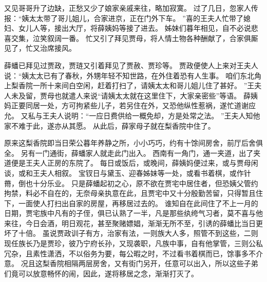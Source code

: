 又见哥哥升了边缺，正愁又少了娘家亲戚来往，略加寂寞。
过了几日，忽家人传报：“姨太太带了哥儿姐儿，合家进京，正在门外下车。
”喜的王夫人忙带了媳妇、女儿人等，接出大厅，将薛姨妈等接了进去。
姊妹们暮年相见，自不必说悲喜交集，泣笑叙阔一番。
忙又引了拜见贾母，将人情土物各种酬献了，合家俱厮见了，忙又治席接风。
\par
薛蟠已拜见过贾政，贾琏又引着拜见了贾赦、贾珍等。
贾政便使人上来对王夫人说：“姨太太已有了春秋，外甥年轻不知世路，在外住着恐有人生事。
咱们东北角上梨香院一所十来间白空闲，赶着打扫了，请姨太太和哥儿姐儿住了甚好。
”王夫人未及留，贾母也就遣人来说“请姨太太就在这里住下，大家亲密些”等语。
薛姨妈正要同居一处，方可拘紧些儿子，若另住在外，又恐他纵性惹祸，遂忙道谢应允。
又私与王夫人说明：“一应日费供给一概免却，方是处常之法。
”王夫人知他家不难于此，遂亦从其愿。
从此后，薛家母子就在梨香院中住了。
\par
原来这梨香院即当日荣公暮年养静之所，小小巧巧，约有十馀间房舍，前厅后舍俱全。
另有一门通街，薛蟠家人就走此门出入。
西南有一角门，通一夹道，出了夹道便是王夫人正房的东院了。
每日或饭后，或晚间，薛姨妈便过来，或与贾母闲谈，或和王夫人相叙。
宝钗日与黛玉、迎春姊妹等一处，或看书着棋，或作针黹，倒也十分乐业。
只是薛蟠起初之心，原不欲在贾宅中居住者，但恐姨父管约拘禁，料必不自在的，无奈母亲执意在此，且贾宅中又十分殷勤苦留，只得暂且住下，一面使人打扫出自家的房屋，再移居过去的。
谁知自在此间住了不上一月的日期，贾宅族中凡有的子侄，俱已认熟了一半，凡是那些纨绔气习者，莫不喜与他来往，今日会酒，明日观花，甚至聚赌嫖娼，渐渐无所不至，引诱的薛蟠比当日更坏了十倍。
虽说贾政训子有方，治家有法，一则族大人多，照管不到这些，二则现任族长乃是贾珍，彼乃宁府长孙，又现袭职，凡族中事，自有他掌管，三则公私冗杂，且素性潇洒，不以俗务为要，每公暇之时，不过看书着棋而已，馀事多不介意。
况且这梨香院相隔两层房舍，又有街门另开，任意可以出入，所以这些子弟们竟可以放意畅怀的闹，因此，遂将移居之念，渐渐打灭了。
\par
{}
